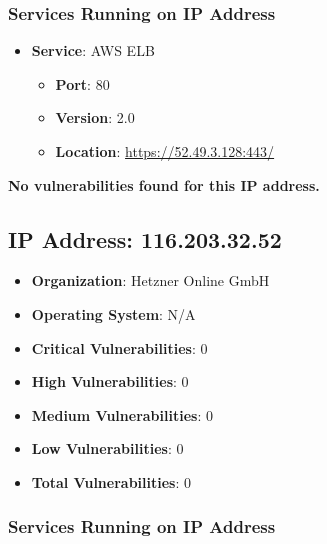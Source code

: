 \documentclass{article}
\begin{document}
\subsubsection*{Services Running on IP Address}

\begin{itemize}
    
        \item \textbf{Service}: AWS ELB
        \begin{itemize}
            \item \textbf{Port}: 80
            \item \textbf{Version}:  2.0 
            \item \textbf{Location}: \href{ https://52.49.3.128:443/ }{ https://52.49.3.128:443/ }
        \end{itemize}
    
\end{itemize}


\textbf{No vulnerabilities found for this IP address.}




\clearpage



\subsection*{IP Address: 116.203.32.52}

\begin{itemize}
    \item \textbf{Organization}: Hetzner Online GmbH
    \item \textbf{Operating System}:  N/A 
    \item \textbf{Critical Vulnerabilities}: 0
    \item \textbf{High Vulnerabilities}: 0
    \item \textbf{Medium Vulnerabilities}: 0
    \item \textbf{Low Vulnerabilities}: 0
    \item \textbf{Total Vulnerabilities}: 0
\end{itemize}

\subsubsection*{Services Running on IP Address}
\end{document}
